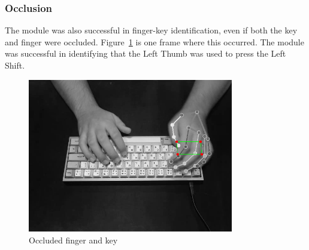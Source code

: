 \documentclass{report}
\begin{document}
\subsubsection{Occlusion}
The module was also successful in finger-key identification, even if both the
key and finger were occluded. Figure~\ref{fig:rd-occluded} is one frame where
this occurred. The module was successful in identifying that the Left Thumb was
used to press the Left Shift.

\begin{figure}[H]
	\centering
	\includegraphics[width=0.8\textwidth]{occluded.png}
	\caption{Occluded finger and key}
	\label{fig:rd-occluded}
\end{figure}
\end{document}
